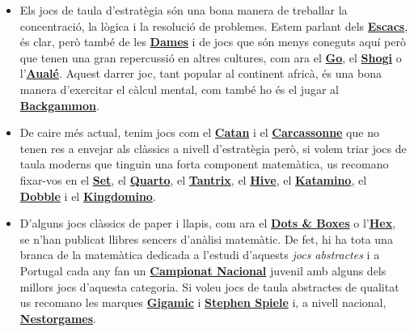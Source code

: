 \documentclass[a4paper, 12pt]{article}
\begin{document}
            \begin{itemize}
                \item Els jocs de taula d'estratègia són una bona manera de treballar la concentració, la lògica i la resolució de problemes. Estem parlant dels \href{https://ca.wikipedia.org/wiki/Escacs}{\textbf{Escacs}}, és clar, però també de les \href{https://ca.wikipedia.org/wiki/Dames}{\textbf{Dames}} i de jocs que són menys coneguts aquí però que tenen una gran repercussió en altres cultures, com ara el \href{https://ca.wikipedia.org/wiki/Go}{\textbf{Go}}, el \href{https://ca.wikipedia.org/wiki/Sh\%C5\%8Dgi}{\textbf{Shogi}} o l'\href{https://ca.wikipedia.org/wiki/Aual\%C3\%A9}{\textbf{Aualé}}. Aquest darrer joc, tant popular al continent africà, és una bona manera d'exercitar el càlcul mental, com també ho és el jugar al \href{https://ca.wikipedia.org/wiki/Backgammon}{\textbf{Backgammon}}.
                \item De caire més actual, tenim jocs com el \href{https://boardgamegeek.com/boardgame/13/catan}{\textbf{Catan}} i el \href{https://boardgamegeek.com/boardgame/822/carcassonne}{\textbf{Carcassonne}} que no tenen res a envejar als clàssics a nivell d'estratègia però, si volem triar jocs de taula moderns que tinguin una forta component matemàtica, us recomano fixar-vos en el \href{https://boardgamegeek.com/boardgame/1198/set}{\textbf{Set}}, el \href{https://boardgamegeek.com/boardgame/681/quarto}{\textbf{Quarto}}, el \href{https://boardgamegeek.com/boardgame/1038/tantrix}{\textbf{Tantrix}}, el \href{https://boardgamegeek.com/boardgame/2655/hive}{\textbf{Hive}}, el \href{https://boardgamegeek.com/boardgame/6931/katamino}{\textbf{Katamino}}, el \href{https://boardgamegeek.com/boardgame/63268/spot-it}{\textbf{Dobble}} i el \href{https://boardgamegeek.com/boardgame/204583/kingdomino}{\textbf{Kingdomino}}.
                \item D'alguns jocs clàssics de paper i llapis, com ara el \href{https://ca.wikipedia.org/wiki/Quadrats}{\textbf{Dots \& Boxes}} o l'\href{https://ca.wikipedia.org/wiki/Hex_(joc)}{\textbf{Hex}}, se n'han publicat llibres sencers d'anàlisi matemàtic. De fet, hi ha tota una branca de la matemàtica dedicada a l'estudi d'aquests \emph{jocs abstractes} i a Portugal cada any fan un \href{http://ludicum.org/cnjm}{\textbf{Campionat Nacional}} juvenil amb alguns dels millors jocs d'aquesta categoria. Si voleu jocs de taula abstractes de qualitat us recomano les marques \href{https://www.gigamic.com/}{\textbf{Gigamic}} i \href{https://www.steffen-spiele.de/}{\textbf{Stephen Spiele}} i, a nivell nacional, \href{https://nestorgames.com}{\textbf{Nestorgames}}.
            \end{itemize}
\end{document}
